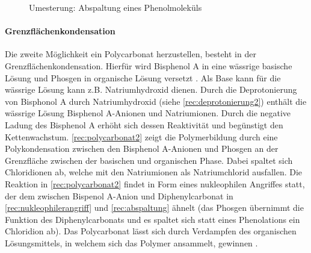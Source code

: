 \begin{figure}[H]
    \begin{center}
        \footnotesize
        \setatomsep{1.7em}


        \vspace{10pt}

        \chemrel{->}
        \chemnameinit{}
        \chemsign{+}

        \caption{Umesterung: Abspaltung eines Phenolmoleküls}
        \label{rec:abspaltung}
    \end{center}
\end{figure}

\paragraph{Grenzflächenkondensation}

Die zweite Möglichkeit ein Polycarbonat herzustellen, besteht in der
Grenzflächenkondensation. Hierfür wird Bisphenol A in eine wässrige basische
Lösung und Phosgen in organische Lösung versetzt \cite{cuzpe}. Als Base kann für
die wässrige Lösung kann z.B. Natriumhydroxid dienen. Durch die Deprotonierung
von Bisphonol A durch Natriumhydroxid (siehe \autoref{rec:deprotonierung2})
enthält die wässrige Lösung Bisphenol A-Anionen und Natriumionen. Durch die
negative Ladung des Bisphenol A erhöht sich dessen Reaktivität und begünstigt
den Kettenwachstum. \autoref{rec:polycarbonat2} zeigt die Polymerbildung durch
eine Polykondensation zwischen den Bisphenol A-Anionen und Phosgen an der
Grenzfläche zwischen der basischen und organischen Phase. Dabei spaltet sich
Chloridionen ab, welche mit den Natriumionen als Natriumchlorid ausfallen. Die
Reaktion in \autoref{rec:polycarbonat2} findet in Form eines nukleophilen
Angriffes statt, der dem zwischen Bispenol A-Anion und Diphenylcarbonat in
\autoref{rec:nukleophilerangriff} und \autoref{rec:abspaltung} ähnelt (das
Phosgen übernimmt die Funktion des Diphenylcarbonats und es spaltet sich statt
eines Phenolations ein Chloridion ab). Das Polycarbonat lässt sich durch
Verdampfen des organischen Lösungsmittels, in welchem sich das Polymer
ansammelt, gewinnen \cite{garoo}.

